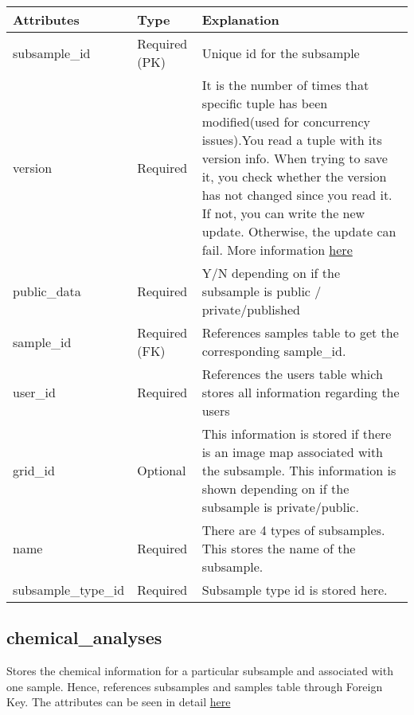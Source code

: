 \documentclass[letterpaper,10pt,english]{sphinxmanual}
\begin{document}
\begin{tabulary}{\linewidth}{|L|L|L|}
\hline
\textbf{
Attributes
} & \textbf{
Type
} & \textbf{
Explanation
}\\\hline

subsample\_id
 & 
Required (PK)
 & 
Unique id for the subsample
\\\hline

version
 & 
Required
 & 
It is the number of times that specific tuple has been modified(used
for concurrency issues).You read a tuple with its version info.
When trying to save it, you check whether the version has not changed
since you read it. If not, you can write the new update.
Otherwise, the update can fail. More
information \href{http://wiki.cs.rpi.edu/trac/metpetdb/wiki/Versioning}{here}
\\\hline

public\_data
 & 
Required
 & 
Y/N depending on if the subsample is public / private/published
\\\hline

sample\_id
 & 
Required (FK)
 & 
References samples table to get the corresponding sample\_id.
\\\hline

user\_id
 & 
Required
 & 
References the users table  which stores all information regarding
the users
\\\hline

grid\_id
 & 
Optional
 & 
This information is stored if there is an image map associated
with the subsample. This information is shown depending on if the
subsample is private/public.
\\\hline

name
 & 
Required
 & 
There are 4 types of subsamples. This stores the name of the subsample.
\\\hline

subsample\_type\_id
 & 
Required
 & 
Subsample type id is stored here.
\\\hline
\end{tabulary}



\subsection{chemical\_analyses}
\label{Table_Description:chemical-analyses}
Stores the chemical information for a particular subsample and associated with one sample. Hence, references subsamples and samples table through Foreign Key. The attributes can be seen in detail \href{http://wiki.cs.rpi.edu/trac/metpetdb/wiki/ChemicalAnalysisObject}{here}
\end{document}
